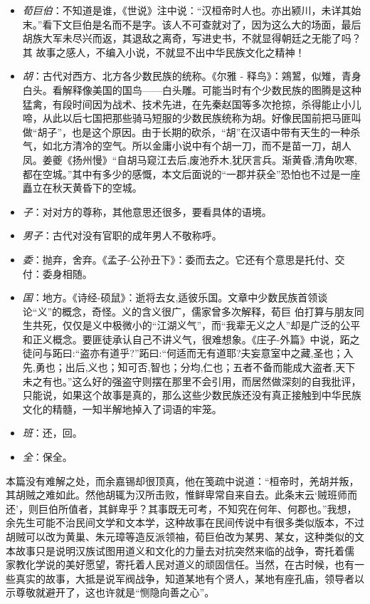 \documentclass[]{book}
\providecommand{\tightlist}{%
  \setlength{\itemsep}{0pt}\setlength{\parskip}{0pt}}
\begin{document}
\begin{itemize}
\tightlist
\item
  \emph{荀巨伯}：不知道是谁，《世说》注中说：``汉桓帝时人也。亦出颍川，未详其始末。''看下文巨伯是名而不是字。该人不可查就对了，因为这么大的场面，最后胡族大军未尽兴而返，其退敌之离奇，写进史书，不就显得朝廷之无能了吗？其
  故事之感人，不编入小说，不就显不出中华民族文化之精神！
\item
  \emph{胡}：古代对西方、北方各少数民族的统称。《尔雅 -
  释鸟》：鶟鶦，似雉，青身白头。看解释像美国的国鸟------白头雕。可能当时有个少数民族的图腾是这种猛禽，有段时间因为战术、技术先进，在先秦赵国等多次抢掠，杀得能止小儿啼，从此以后七国把那些骑马短服的少数民族统称为胡。好像民国前把马匪叫做``胡子''，也是这个原因。由于长期的砍杀，``胡''在汉语中带有天生的一种杀气，如北方清冷的空气。所以金庸小说中有个胡一刀，而不是苗一刀，胡人凤。姜夔《扬州慢》``自胡马窥江去后,废池乔木,犹厌言兵。渐黄昏,清角吹寒,都在空城。''其中有多少的感慨，本文后面说的``一郡并获全''恐怕也不过是一座矗立在秋天黄昏下的空城。
\item
  \emph{子}：对对方的尊称，其他意思还很多，要看具体的语境。
\item
  \emph{男子}：古代对没有官职的成年男人不敬称呼。
\item
  \emph{委}：抛弃，舍弃。《孟子-公孙丑下》：委而去之。它还有个意思是托付、交付：委身相随。
\item
  \emph{国}：地方。《诗经-硕鼠》：逝将去女,适彼乐国。文章中少数民族首领谈论``义''的概念，奇怪。义的含义很广，儒家曾多次解释，荀巨
  伯打算与朋友同生共死，仅仅是义中极微小的``江湖义气''，而``我辈无义之人''却是广泛的公平和正义概念。要匪徒承认自己不讲义气，很难想象。《庄子-外篇》中说，跖之徒问与跖曰:``盗亦有道乎?''跖曰:``何适而无有道耶?夫妄意室中之藏,圣也；入先,勇也；出后,义也；知可否,智也；分均,仁也；五者不备而能成大盗者,天下未之有也。''这么好的强盗守则摆在那里不会引用，而居然做深刻的自我批评，只能说，如果这个故事是真的，那么这些少数民族还没有真正接触到中华民族文化的精髓，一知半解地掉入了词语的牢笼。
\item
  \emph{班}：还，回。
\item
  \emph{全}：保全。
\end{itemize}

本篇没有难解之处，而余嘉锡却很顶真，他在笺疏中说道：``桓帝时，羌胡并叛，其胡贼之难如此。然他胡辄为汉所击败，惟鲜卑常自来自去。此条末云`贼班师而还'，则巨伯所值者，其鲜卑乎？其事既无可考，不知究在何年、何郡也。''我想，余先生可能不治民间文学和文本学，这种故事在民间传说中有很多类似版本，不过胡贼可以改为黄巢、朱元璋等造反派领袖，荀巨伯改为某男、某女，这种类似的文本故事只是说明汉族试图用道义和文化的力量去对抗突然来临的战争，寄托着儒
家教化学说的美好愿望，寄托着人民对道义的顽固信任。当然，在古时候，也有一些真实的故事，大抵是说军阀战争，知道某地有个贤人，某地有座孔庙，领导者以
示尊敬就避开了，这也许就是``恻隐向善之心''。
\end{document}
